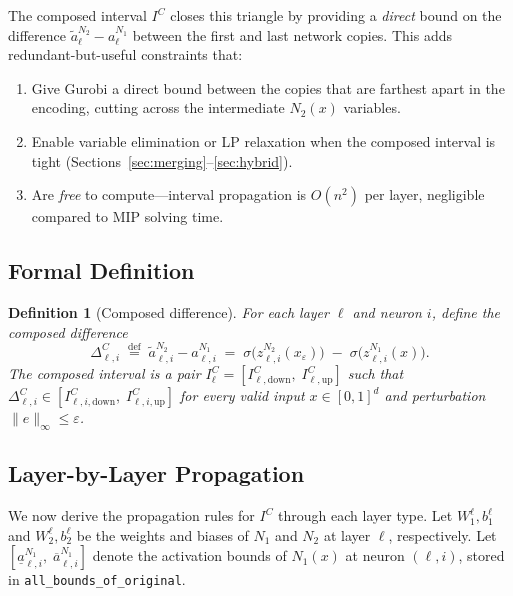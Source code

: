 \documentclass[11pt]{article}
\newcommand{\eps}{\varepsilon}
\newcommand{\layerl}{\ell}
\newtheorem{definition}{Definition}
\begin{document}
The composed interval $I^C$ closes this triangle by providing a \emph{direct}
bound on the difference $\tilde{a}^{N_2}_\layerl - a^{N_1}_\layerl$
between the first and last network copies.
This adds redundant-but-useful constraints that:
\begin{enumerate}
    \item Give Gurobi a direct bound between the copies that are farthest apart
          in the encoding, cutting across the intermediate $N_2(x)$ variables.
    \item Enable variable elimination or LP relaxation when the composed
          interval is tight (Sections~\ref{sec:merging}--\ref{sec:hybrid}).
    \item Are \emph{free} to compute---interval propagation is $O(n^2)$ per layer,
          negligible compared to MIP solving time.
\end{enumerate}

\subsection{Formal Definition}
\label{sec:composed:def}

\begin{definition}[Composed difference]
For each layer $\layerl$ and neuron $i$, define the \emph{composed difference}
\begin{equation}
    \Delta^C_{\layerl,i}
    \;\stackrel{\text{def}}{=}\;
    \tilde{a}^{N_2}_{\layerl,i} - a^{N_1}_{\layerl,i}
    \;=\;
    \sigma\!\bigl(z^{N_2}_{\layerl,i}(x_\varepsilon)\bigr)
    \;-\;
    \sigma\!\bigl(z^{N_1}_{\layerl,i}(x)\bigr).
\end{equation}
The \emph{composed interval} is a pair
$I^C_\layerl = [I^C_{\layerl,\mathrm{down}},\; I^C_{\layerl,\mathrm{up}}]$
such that $\Delta^C_{\layerl,i} \in [I^C_{\layerl,i,\mathrm{down}},\; I^C_{\layerl,i,\mathrm{up}}]$
for every valid input $x \in [0,1]^d$ and perturbation $\|e\|_\infty \le \eps$.
\end{definition}

\subsection{Layer-by-Layer Propagation}
\label{sec:composed:propagation}

We now derive the propagation rules for $I^C$ through each layer type.
Let $W_1^\layerl, b_1^\layerl$ and $W_2^\layerl, b_2^\layerl$ be the
weights and biases of $N_1$ and $N_2$ at layer $\layerl$, respectively.
Let $[\underline{a}^{N_1}_{\layerl,i},\; \overline{a}^{N_1}_{\layerl,i}]$
denote the activation bounds of $N_1(x)$ at neuron $(\layerl, i)$,
stored in \texttt{all\_bounds\_of\_original}.
\end{document}
